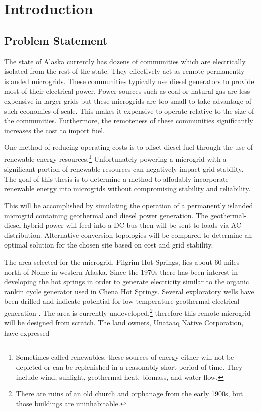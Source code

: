\chapter{Introduction}
\label{ch:intro}

\section{Problem Statement}
The state of Alaska currently has dozens of communities which are electrically isolated from the rest of the state. They effectively act as remote permanently islanded microgrids. These communities typically use diesel generators to provide most of their electrical power. Power sources such as coal or natural gas are less expensive in larger grids but these microgrids are too small to take advantage of such economies of scale. This makes it expensive to operate relative to the size of the communities. Furthermore, the remoteness of these communities significantly increases the cost to import fuel.

One method of reducing operating costs is to offset diesel fuel through the use of renewable energy resources.\footnote{Sometimes called renewables, these sources of energy either will not be depleted or can be replenished in a reasonably short period of time. They include wind, sunlight, geothermal heat, biomass, and water flow.} Unfortunately powering a microgrid with a significant portion of renewable resources can negatively impact grid stability. The goal of this thesis is to determine a method to affodably incorporate renewable energy into microgrids without compromising stability and reliability. 

This will be accomplished by simulating the operation of a permanently islanded microgrid containing geothermal and diesel power generation. The geo\-ther\-mal\--die\-sel hybrid power will feed into a DC bus then will be sent to loads via AC distribution. Alternative conversion topologies will be compared to determine an optimal solution for the chosen site based on cost and grid stability.

The area selected for the microgrid, Pilgrim Hot Springs, lies about 60 miles north of Nome in western Alaska. Since the 1970s there has been interest in developing the hot springs in order to generate electricity similar to the organic rankin cycle generator used in Chena Hot Springs. Several exploratory wells have been drilled and indicate potential for low temperature geothermal electrical generation \cite{Holdmann2013}. The area is currently undeveloped,\footnote{There are ruins of an old church and orphanage from the early 1900s, but those buildings are uninhabitable.} therefore this remote microgrid will be designed from scratch. The land owners, Unataaq Native Corporation, have expressed

